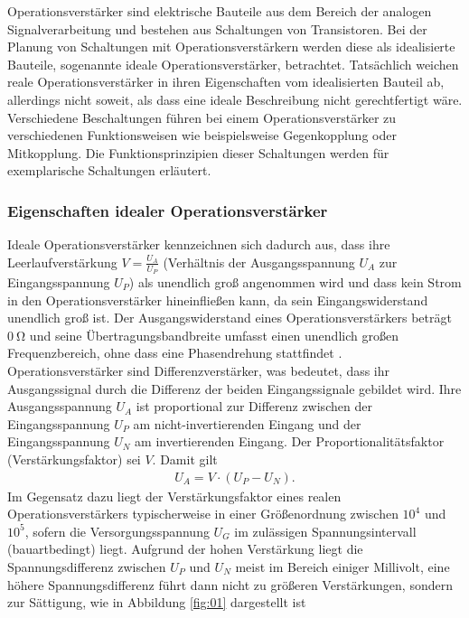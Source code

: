 Operationsverstärker sind elektrische Bauteile aus dem Bereich der analogen
Signalverarbeitung und bestehen aus Schaltungen von Transistoren. Bei der
Planung von Schaltungen mit Operationsverstärkern werden diese als idealisierte
Bauteile, sogenannte ideale Operationsverstärker, betrachtet. Tatsächlich
weichen reale Operationsverstärker in ihren Eigenschaften vom idealisierten
Bauteil ab, allerdings nicht soweit, als dass eine ideale Beschreibung nicht
gerechtfertigt wäre. \\
\noindent Verschiedene Beschaltungen führen bei einem Operationsverstärker zu
verschiedenen Funktionsweisen wie beispielsweise Gegenkopplung oder
Mitkopplung. Die Funktionsprinzipien dieser Schaltungen werden für exemplarische
Schaltungen erläutert.
\subsubsection{Eigenschaften idealer Operationsverstärker}
Ideale Operationsverstärker kennzeichnen sich dadurch aus, dass ihre
Leerlaufverstärkung $V = \frac{U_A}{U_P}$ (Verhältnis der Ausgangsspannung $U_A$
zur Eingangsspannung $U_P$) als unendlich groß angenommen wird und
dass kein Strom in den Operationsverstärker hineinfließen kann, da sein
Eingangswiderstand unendlich groß ist. Der
Ausgangswiderstand eines Operationsverstärkers beträgt $\SI{0}{\ohm}$ und seine Übertragungsbandbreite
umfasst einen unendlich großen Frequenzbereich, ohne dass eine Phasendrehung
stattfindet \cite{federau}. \\
\noindent Operationsverstärker sind Differenzverstärker, was bedeutet, dass ihr
Ausgangssignal durch die Differenz der beiden Eingangssignale gebildet wird.
Ihre Ausgangsspannung $U_A$
ist proportional zur Differenz zwischen der Eingangsspannung $U_P$ am
nicht-invertierenden Eingang und der Eingangsspannung $U_N$ am
invertierenden Eingang. Der Proportionalitätsfaktor (Verstärkungsfaktor) sei $V$. Damit gilt
\begin{align}
  U_A = V \cdot \left(U_P - U_N \right).
  \label{eqn:01}
\end{align}
\noindent Im Gegensatz dazu liegt der Verstärkungsfaktor eines realen
Operationsverstärkers typischerweise in einer Größenordnung
zwischen ${10^4}$ und ${10^5}$, sofern die Versorgungsspannung $U_G$ im
zulässigen Spannungsintervall (bauartbedingt) liegt. Aufgrund der hohen
Verstärkung liegt die Spannungsdifferenz zwischen $U_P$ und $U_N$ meist im
Bereich einiger Millivolt, eine höhere Spannungsdifferenz führt dann nicht
zu größeren Verstärkungen, sondern zur Sättigung, wie in Abbildung \ref{fig:01} dargestellt ist
